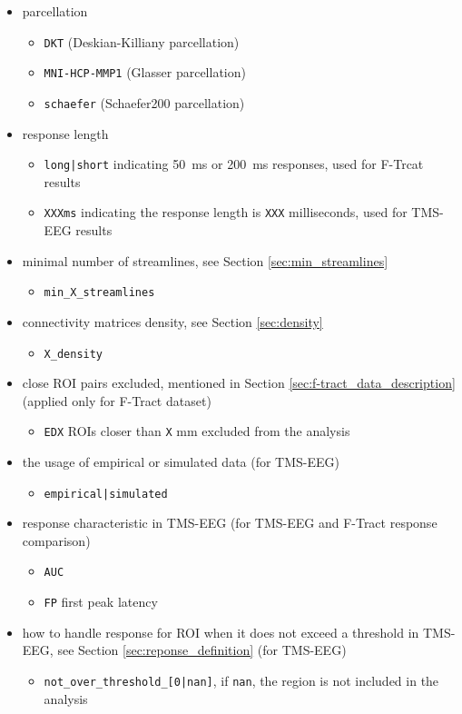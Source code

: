 \begin{itemize}
    \item parcellation
    \begin{itemize}
        \item \texttt{DKT} (Deskian-Killiany parcellation)
        \item \texttt{MNI-HCP-MMP1} (Glasser parcellation)
        \item \texttt{schaefer} (Schaefer200 parcellation)
    \end{itemize}
    \item response length
    \begin{itemize}
        \item \texttt{long|short} indicating 50~ms or 200~ms responses, used for F-Trcat results
        \item \texttt{XXXms} indicating the response length is \texttt{XXX} milliseconds, used for TMS-EEG results
    \end{itemize}
    \item minimal number of streamlines, see Section \ref{sec:min_streamlines}
    \begin{itemize}
        \item \texttt{min\_X\_streamlines}
    \end{itemize}
    \item connectivity matrices density, see Section \ref{sec:density}
    \begin{itemize}
        \item \texttt{X\_density} 
    \end{itemize}
    \item close ROI pairs excluded, mentioned in Section \ref{sec:f-tract_data_description} (applied only for F-Tract dataset)
    \begin{itemize}
        \item \texttt{EDX} ROIs closer than \texttt{X} mm excluded from the analysis 
    \end{itemize}
    \item the usage of empirical or simulated data (for TMS-EEG)
    \begin{itemize}
        \item \texttt{empirical|simulated} 
    \end{itemize} 
    \item response characteristic in TMS-EEG (for TMS-EEG and F-Tract response comparison)
    \begin{itemize}
        \item \texttt{AUC} 
        \item \texttt{FP} first peak latency 
    \end{itemize} 
    \item how to handle response for ROI when it does not exceed a threshold in TMS-EEG, see Section \ref{sec:reponse_definition} (for TMS-EEG)
    \begin{itemize}
        \item \texttt{not\_over\_threshold\_[0|nan]}, if \texttt{nan}, the region is not included in the analysis
    \end{itemize} 
\end{itemize}